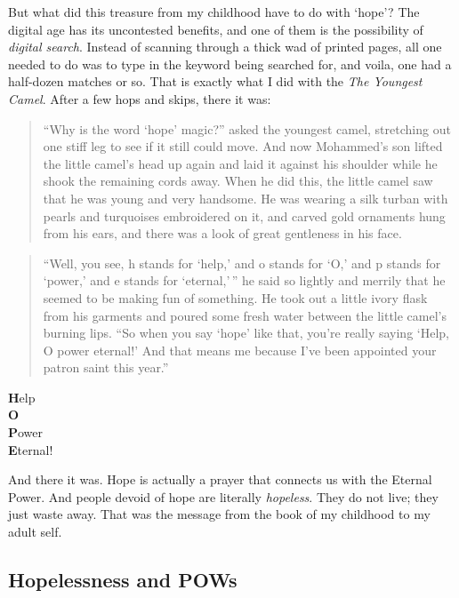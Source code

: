 \documentclass[
  a4paper,
]{article}
\begin{document}
But what did this treasure from my childhood have to do with `hope'? The
digital age has its uncontested benefits, and one of them is the
possibility of \emph{digital search}. Instead of scanning through a
thick wad of printed pages, all one needed to do was to type in the
keyword being searched for, and voila, one had a half-dozen matches or
so. That is exactly what I did with the \emph{The Youngest Camel}. After
a few hops and skips, there it was:

\begin{quote}
``Why is the word `hope' magic?'' asked the youngest camel, stretching
out one stiff leg to see if it still could move. And now Mohammed's son
lifted the little camel's head up again and laid it against his shoulder
while he shook the remaining cords away. When he did this, the little
camel saw that he was young and very handsome. He was wearing a silk
turban with pearls and turquoises embroidered on it, and carved gold
ornaments hung from his ears, and there was a look of great gentleness
in his face.
\end{quote}

\begin{quote}
``Well, you see, h stands for `help,' and o stands for `O,' and p stands
for `power,' and e stands for `eternal,'\,'' he said so lightly and
merrily that he seemed to be making fun of something. He took out a
little ivory flask from his garments and poured some fresh water between
the little camel's burning lips. ``So when you say `hope' like that,
you're really saying `Help, O power eternal!' And that means me because
I've been appointed your patron saint this year.''
\end{quote}

\begin{center}

\textbf{H}elp\\
\textbf{O}\\
\textbf{P}ower\\
\textbf{E}ternal!

\end{center}

And there it was. Hope is actually a prayer that connects us with the
Eternal Power. And people devoid of hope are literally \emph{hopeless}.
They do not live; they just waste away. That was the message from the
book of my childhood to my adult self.

\hypertarget{hopelessness-and-pows}{%
\subsection{Hopelessness and POWs}\label{hopelessness-and-pows}}
\end{document}
